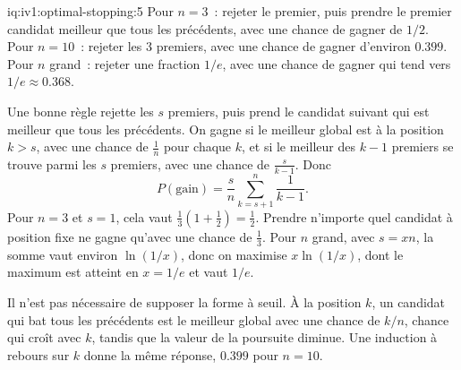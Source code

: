 \begin{solution}{iq:iv1:optimal-stopping:5}
Pour $n = 3$~: rejeter le premier, puis prendre le premier candidat meilleur que tous les précédents, avec une chance de gagner de $1/2$. Pour $n = 10$~: rejeter les 3 premiers, avec une chance de gagner d'environ $0.399$. Pour $n$ grand~: rejeter une fraction $1/e$, avec une chance de gagner qui tend vers $1/e \approx 0.368$.

Une bonne règle rejette les $s$ premiers, puis prend le candidat suivant qui est meilleur que tous les précédents. On gagne si le meilleur global est à la position $k > s$, avec une chance de $\tfrac1n$ pour chaque $k$, et si le meilleur des $k - 1$ premiers se trouve parmi les $s$ premiers, avec une chance de $\tfrac{s}{k - 1}$. Donc
\[
P(\text{gain}) = \frac{s}{n} \sum_{k = s + 1}^{n} \frac{1}{k - 1}.
\]
Pour $n = 3$ et $s = 1$, cela vaut $\tfrac13(1 + \tfrac12) = \tfrac12$. Prendre n'importe quel candidat à position fixe ne gagne qu'avec une chance de $\tfrac13$. Pour $n$ grand, avec $s = xn$, la somme vaut environ $\ln(1/x)$, donc on maximise $x\ln(1/x)$, dont le maximum est atteint en $x = 1/e$ et vaut $1/e$.

Il n'est pas nécessaire de supposer la forme à seuil. À la position $k$, un candidat qui bat tous les précédents est le meilleur global avec une chance de $k/n$, chance qui croît avec $k$, tandis que la valeur de la poursuite diminue. Une induction à rebours sur $k$ donne la même réponse, $0.399$ pour $n = 10$.

\end{solution}

